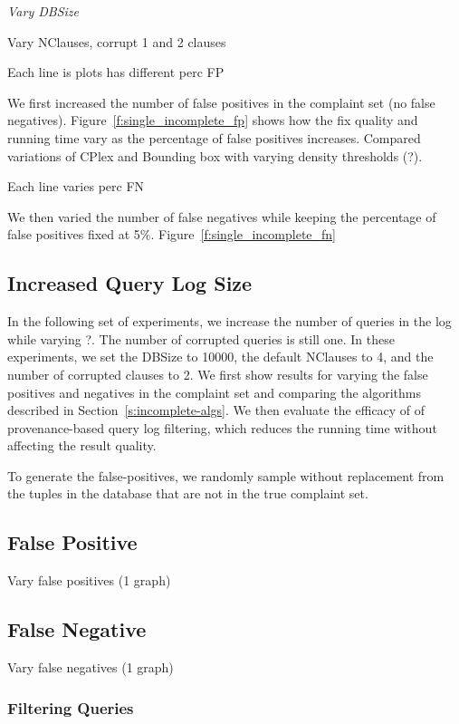 {\it 
Vary DBSize

Vary NClauses, corrupt 1 and 2 clauses

Each line is plots has different perc FP
}

We first increased the number of false positives in the complaint set (no false negatives).
Figure~\ref{f:single_incomplete_fp} shows how the fix quality and running time vary as the
percentage of false positives increases.   Compared variations of CPlex and Bounding box with varying
density thresholds (?).

Each line varies perc FN

We then varied the number of false negatives while keeping the percentage of false positives fixed at 5\%.
Figure~\ref{f:single_incomplete_fn} 


\subsection{Increased Query Log Size}

In the following set of experiments, we increase the number of
queries in the log while varying ?.  The number of corrupted queries
is still one.  In these experiments, we set the DBSize to 10000,
the default NClauses to 4, and the number of corrupted clauses to
2.   We first show results for varying the false positives and
negatives in the complaint set and comparing the algorithms described
in Section~\ref{s:incomplete-algs}.  We then evaluate the efficacy
of of provenance-based query log filtering, which reduces the running
time without affecting the result quality.

To generate the false-positives, we randomly sample without replacement
from the tuples in the database that are not in the true complaint
set.

\subsection{False Positive}

Vary false positives (1 graph)


\subsection{False Negative}

Vary false negatives (1 graph)

\subsubsection{Filtering Queries}

